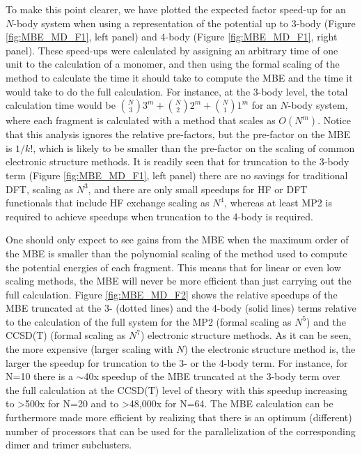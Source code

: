 \documentclass[11pt, proquest]{uwthesis}[2020/02/24]
\begin{document}


\par To make this point clearer, we have plotted the expected factor speed-up for an $N$-body system when using a representation of the potential up to 3-body (Figure \ref{fig:MBE_MD_F1}, left panel) and 4-body (Figure \ref{fig:MBE_MD_F1}, right panel). These speed-ups were calculated by assigning an arbitrary time of one unit to the calculation of a monomer, and then using the formal scaling of the method to calculate the time it should take to compute the MBE and the time it would take to do the full calculation. For instance, at the 3-body level, the total calculation time would be $\binom{N}{3}3^m+\binom{N}{2}2^m+\binom{N}{1}1^m$ for an $N$-body system, where each fragment is calculated with a method that scales as $O(N^m)$. Notice that this analysis ignores the relative pre-factors, but the pre-factor on the MBE is $1/k!$, which is likely to be smaller than the pre-factor on the scaling of common electronic structure methods. It is readily seen that for truncation to the 3-body term (Figure \ref{fig:MBE_MD_F1}, left panel) there are no savings for traditional DFT, scaling as $N^3$, and there are only small speedups for HF or DFT functionals that include HF exchange scaling as $N^4$, whereas at least MP2 is required to achieve speedups when truncation to the 4-body is required.



\par One should only expect to see gains from the MBE when the maximum order of the MBE is smaller than the polynomial scaling of the method used to compute the potential energies of each fragment. This means that for linear or even low scaling methods, the MBE will never be more efficient than just carrying out the full calculation. Figure \ref{fig:MBE_MD_F2} shows the relative speedups of the MBE truncated at the 3- (dotted lines) and the 4-body (solid lines) terms relative to the calculation of the full system for the MP2 (formal scaling as $N^5$) and the CCSD(T) (formal scaling as $N^7$) electronic structure methods. As it can be seen, the more expensive (larger scaling with $N$) the electronic structure method is, the larger the speedup for truncation to the 3- or the 4-body term. For instance, for N=10 there is a $\sim$40x speedup of the MBE truncated at the 3-body term over the full calculation at the CCSD(T) level of theory with this speedup increasing to \textgreater500x for N=20 and to \textgreater48,000x for N=64. The MBE calculation can be furthermore made more efficient by realizing that there is an optimum (different) number of processors that can be used for the parallelization of the corresponding dimer and trimer subclusters.
\end{document}
